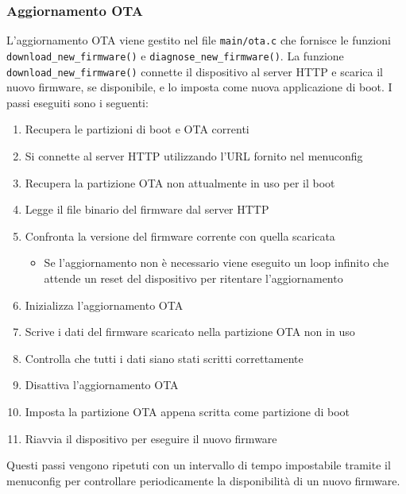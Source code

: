 \documentclass[a4paper]{article}
\begin{document}
\subsubsection{Aggiornamento OTA}
L'aggiornamento OTA viene gestito nel file \texttt{main/ota.c} che fornisce le funzioni
\texttt{download\_new\_firmware()} e \texttt{diagnose\_new\_firmware()}. La funzione
\texttt{download\_new\_firmware()} connette il dispositivo al server HTTP e scarica
il nuovo firmware, se disponibile, e lo imposta come nuova applicazione di boot.
I passi eseguiti sono i seguenti:
\begin{enumerate}
  \item Recupera le partizioni di boot e OTA correnti
  \item Si connette al server HTTP utilizzando l'URL fornito nel menuconfig
  \item Recupera la partizione OTA non attualmente in uso per il boot
  \item Legge il file binario del firmware dal server HTTP
  \item Confronta la versione del firmware corrente con quella scaricata
    \begin{itemize}
      \item Se l'aggiornamento non è necessario viene eseguito un loop infinito
        che attende un reset del dispositivo per ritentare l'aggiornamento
    \end{itemize}
  \item Inizializza l'aggiornamento OTA
  \item Scrive i dati del firmware scaricato nella partizione OTA non in uso
  \item Controlla che tutti i dati siano stati scritti correttamente
  \item Disattiva l'aggiornamento OTA
  \item Imposta la partizione OTA appena scritta come partizione di boot
  \item Riavvia il dispositivo per eseguire il nuovo firmware
\end{enumerate}
Questi passi vengono ripetuti con un intervallo di tempo impostabile tramite il
menuconfig per controllare periodicamente la disponibilità di un nuovo firmware.
\end{document}
